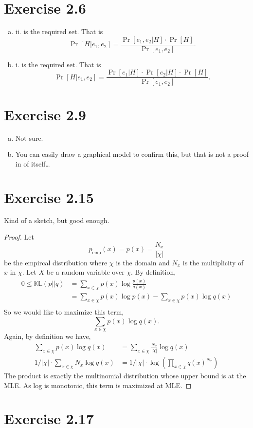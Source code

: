 \documentclass[12pt]{article}
\newcommand{\bayes}[2]{\frac{\Pr[#2|#1] \cdot \Pr[#1]}{\Pr[#2]}}
\newcommand{\KL}[2]{\mathbb{KL}(#1||#2)}
\begin{document}
\section*{Exercise 2.6}
\begin{enumerate}[a)]
    \item ii. is the required set. That is \[\Pr[H|e_1, e_2] = \bayes{H}{e_1, e_2}.\]
    \item i. is the required set. That is
        \[\Pr[H|e_1, e_2] = \frac{\Pr[e_1|H] \cdot \Pr[e_2|H] \cdot \Pr[H]}{\Pr[e_1, e_2]}.\]
\end{enumerate}
\section*{Exercise 2.9}
\begin{enumerate}[a)]
    \item Not sure.
    \item You can easily draw a graphical model to confirm this, but that is
        not a proof in of itself\dots
\end{enumerate}
\section*{Exercise 2.15}
Kind of a sketch, but good enough.
\begin{proof}
    Let \[p_{\text{emp}}(x) = p(x) = \frac{N_x}{|\chi|}\] be the empircal
    distribution where $\chi$ is the domain and $N_x$ is the multiplicity of
    $x$ in $\chi$. Let $X$ be a random variable over $\chi$. By definition,
    \begin{align*}
        0 \leq \KL{p}{q} &= \sum_{x \in \chi} p(x) \log \frac{p(x)}{q(x)}\\
        &= \sum_{x \in \chi} p(x) \log p(x) - \sum_{x \in \chi} p(x) \log q(x)\\
    \end{align*}
    So we would like to maximize this term,
    \[\sum_{x \in \chi} p(x) \log q(x).\]
    Again, by definition we have,
    \begin{align*}
    \sum_{x \in \chi} p(x) \log q(x) &= \sum_{x \in \chi} \frac{N_x}{|\chi|} \log q(x)\\
    1/|\chi| \cdot \sum_{x \in \chi} N_x \log q(x) &= 1/|\chi| \cdot \log \left(
        \prod_{x \in \chi} q(x)^{N_x} \right)
    \end{align*}
    The product is exactly the multinomial distribution whose upper bound is at
    the MLE. As log is monotonic, this term is maximized at MLE.
\end{proof}

\section*{Exercise 2.17}
\end{document}
